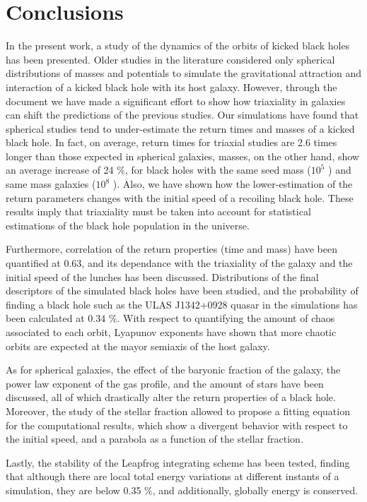 
\chapter{Conclusions}\label{Conclusions}
In the present work, a study of the dynamics of the orbits of kicked black holes has been presented. Older studies in the literature considered only spherical distributions of masses and potentials to simulate the gravitational attraction and interaction of a kicked black hole with its host galaxy. However, through the document we have made a significant effort to show how triaxiality in galaxies can shift the predictions of the previous studies. Our simulations have found that spherical studies tend to under-estimate the return times and masses of a kicked black hole. In fact, on average, return times for triaxial studies are 2.6 times longer than those expected in spherical galaxies, masses, on the other hand, show an average increase of 24 \%, for black holes with the same seed mass ($10^5$ \sm) and same mass galaxies ($10^8$ \sm). Also, we have shown how the lower-estimation of the return parameters changes with the initial speed of a recoiling black hole. These results imply that triaxiality must be taken into account for statistical estimations of the black hole population in the universe. 

\vspace{1cm}

Furthermore, correlation of the return properties (time and mass) have been quantified at 0.63, and its dependance with the triaxiality of the galaxy and the initial speed of the lunches has been discussed. Distributions of the final descriptors of the simulated black holes have been studied, and the probability of finding a black hole such as the ULAS J1342+0928 quasar in the simulations has been calculated at 0.34 \%. With respect to quantifying the amount of chaos associated to each orbit, Lyapunov exponents have shown that more chaotic orbits are expected at the mayor semiaxis of the host galaxy.  

\vspace{1cm}

As for spherical galaxies, the effect of the baryonic fraction of the galaxy, the power law exponent of the gas profile, and the amount of stars have been discussed, all of which drastically alter the return properties of a black hole. Moreover, the study of the stellar fraction allowed to propose a fitting equation for the computational results, which show a divergent behavior with respect to the initial speed, and a parabola as a function of the stellar fraction.

\vspace{1cm}

Lastly, the stability of the Leapfrog integrating scheme has been tested, finding that although there are local total energy variations at different instants of a simulation, they are below 0.35 \%, and additionally, globally energy is conserved.
